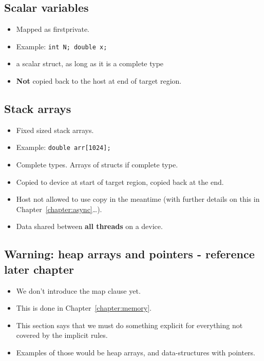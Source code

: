 \subsection{Scalar variables}
\begin{itemize}
  \item Mapped as firstprivate.
  \item Example: {\tt int N; double x;}
  \item a scalar struct, as long as it is a complete type
  \item {\bf Not} copied back to the host at end of target region.
\end{itemize}

\subsection{Stack arrays}
\begin{itemize}
  \item Fixed sized stack arrays.
  \item Example: {\tt double arr[1024];}
  \item Complete types. Arrays of structs if complete type.
  \item Copied to device at start of target region, copied back at the end.
  \item Host not allowed to use copy in the meantime (with further details on this in Chapter~\ref{chapter:async}\dots).
  \item Data shared between {\bf all threads} on a device.
\end{itemize}

\subsection{Warning: heap arrays and pointers - reference later chapter}
\begin{itemize}
  \item We don't introduce the map clause yet.
  \item This is done in Chapter~\ref{chapter:memory}.
  \item This section says that we must do something explicit for everything not covered by the implicit rules.
  \item Examples of those would be heap arrays, and data-structures with pointers.
\end{itemize}

